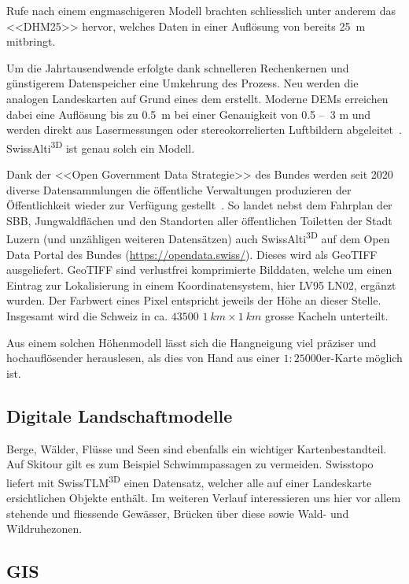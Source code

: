 Rufe nach einem engmaschigeren Modell brachten schliesslich unter anderem das <<DHM25>> hervor, welches Daten in einer Auflösung von bereits \qty{25}{m} mitbringt.~\cite{swisstopohistdem}

Um die Jahrtausendwende erfolgte dank schnelleren Rechenkernen und günstigerem Datenspeicher eine Umkehrung des Prozess. Neu werden die analogen Landeskarten auf Grund eines \acrshort{dem} erstellt. Moderne DEMs erreichen dabei eine Auflösung bis zu \qty{0.5}{m} bei einer Genauigkeit von 0.5 --~3 \unit{m} und werden direkt aus Lasermessungen oder stereokorrelierten Luftbildern abgeleitet~\cite{alti3dprod}. SwissAlti\textsuperscript{3D} ist genau solch ein Modell.

Dank der <<Open Government Data Strategie>> des Bundes werden seit 2020 diverse Datensammlungen die öffentliche Verwaltungen produzieren der Öffentlichkeit wieder zur Verfügung gestellt~\cite{opendataswiss}.
So landet nebst dem Fahrplan der SBB, Jungwaldflächen und den Standorten aller öffentlichen Toiletten der Stadt Luzern (und unzähligen weiteren Datensätzen) auch  SwissAlti\textsuperscript{3D} auf dem Open Data Portal des Bundes (\url{https://opendata.swiss/}).
Dieses wird als GeoTIFF ausgeliefert. GeoTIFF sind verlustfrei komprimierte Bilddaten, welche um einen Eintrag zur Lokalisierung in einem Koordinatensystem, hier LV95 LN02, ergänzt wurden. Der Farbwert eines Pixel entspricht jeweils der Höhe an dieser Stelle. Insgesamt wird die Schweiz in ca. $43500$ $\qty{1}{km} \times \qty{1}{km}$ grosse Kacheln unterteilt.~\cite{alti3dprod} 

Aus einem solchen Höhenmodell lässt sich die Hangneigung viel präziser und hochauflösender herauslesen, als dies von Hand aus einer $1:25000$er-Karte möglich ist.

\subsection{Digitale Landschaftmodelle}

Berge, Wälder, Flüsse und Seen sind ebenfalls ein wichtiger Kartenbestandteil. Auf Skitour gilt es zum Beispiel Schwimmpassagen zu vermeiden. Swisstopo liefert mit SwissTLM\textsuperscript{3D} einen Datensatz, welcher alle auf einer Landeskarte ersichtlichen Objekte enthält. Im weiteren Verlauf interessieren uns hier vor allem stehende und fliessende Gewässer, Brücken über diese sowie Wald- und Wildruhezonen.

\subsection{GIS}\label{sec:gis}

